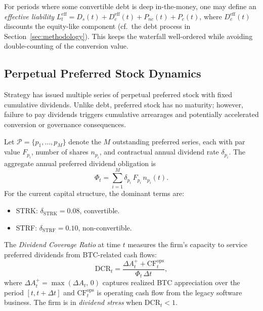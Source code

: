 \begin{remark}
For periods where some convertible debt is deep in-the-money, one may define
an \emph{effective liability}
$L_t^{\mathrm{eff}} = D_s(t) + D_c^{\mathrm{eff}}(t) + P_{nc}(t) + P_c(t)$,
where $D_c^{\mathrm{eff}}(t)$ discounts the equity-like component
(cf.\ the debt process in Section~\ref{sec:methodology}).  This keeps the waterfall
well-ordered while avoiding double-counting of the conversion value.
\end{remark}

\subsection{Perpetual Preferred Stock Dynamics}\label{subsec:preferred}

Strategy has issued multiple series of perpetual preferred stock with fixed
cumulative dividends.  Unlike debt, preferred stock has no maturity; however,
failure to pay dividends triggers cumulative arrearages and potentially
accelerated conversion or governance consequences.

\begin{definition}\label{def:pfd_divs}
Let $\mathcal{P} = \{p_1,\ldots,p_M\}$ denote the $M$ outstanding preferred
series, each with par value $F_{p_i}$, number of shares $n_{p_i}$, and
contractual annual dividend rate $\delta_{p_i}$.  The aggregate annual
preferred dividend obligation is
\begin{equation}\label{eq:agg_pfd_div}
  \Phi_t = \sum_{i=1}^{M} \delta_{p_i}\, F_{p_i}\, n_{p_i}(t).
\end{equation}
For the current capital structure, the dominant terms are:
\begin{itemize}
  \item STRK: $\delta_{\mathrm{STRK}} = 0.08$, convertible.
  \item STRF: $\delta_{\mathrm{STRF}} = 0.10$, non-convertible.
\end{itemize}
\end{definition}

\begin{definition}\label{def:dcr}
The \emph{Dividend Coverage Ratio} at time $t$ measures the firm's capacity
to service preferred dividends from BTC-related cash flows:
\begin{equation}\label{eq:dcr}
  \mathrm{DCR}_t
  = \frac{\Delta A_t^+ + \mathrm{CF}_t^{\mathrm{ops}}}{\Phi_t\,\Delta t},
\end{equation}
where $\Delta A_t^+ = \max(\Delta A_t,\, 0)$ captures realized BTC
appreciation over the period $[t, t+\Delta t]$ and
$\mathrm{CF}_t^{\mathrm{ops}}$ is operating cash flow from the legacy
software business.  The firm is in \emph{dividend stress} when
$\mathrm{DCR}_t < 1$.
\end{definition}

